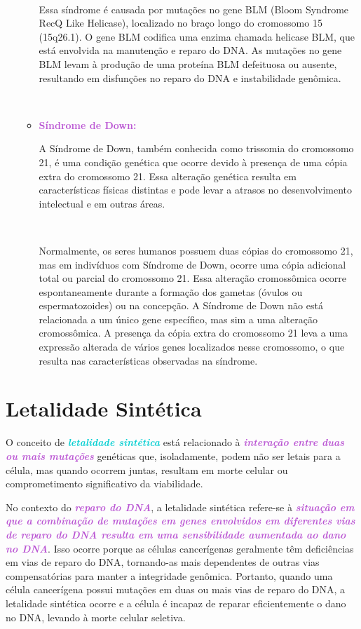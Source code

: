 \documentclass[11pt,a4paper]{article}
\begin{document}
\begin{itemize}[label=\textcolor{CarnationPink}{$\blacktriangleright$}]
\begin{itemize}[label=\textcolor{CarnationPink}{$\star$}]
			\

			Essa síndrome é causada por mutações no gene BLM (Bloom Syndrome RecQ Like Helicase), localizado no braço longo do cromossomo 15 (15q26.1). O gene BLM codifica uma enzima chamada helicase BLM, que está envolvida na manutenção e reparo do DNA. As mutações no gene BLM levam à produção de uma proteína BLM defeituosa ou ausente, resultando em disfunções no reparo do DNA e instabilidade genômica.

			\

			\item \textcolor{MediumOrchid}{\large\textbf{Síndrome de Down:}}
			
			A Síndrome de Down, também conhecida como trissomia do cromossomo 21, é uma condição genética que ocorre devido à presença de uma cópia extra do cromossomo 21. Essa alteração genética resulta em características físicas distintas e pode levar a atrasos no desenvolvimento intelectual e em outras áreas.

			\

			Normalmente, os seres humanos possuem duas cópias do cromossomo 21, mas em indivíduos com Síndrome de Down, ocorre uma cópia adicional total ou parcial do cromossomo 21. Essa alteração cromossômica ocorre espontaneamente durante a formação dos gametas (óvulos ou espermatozoides) ou na concepção. A Síndrome de Down não está relacionada a um único gene específico, mas sim a uma alteração cromossômica. A presença da cópia extra do cromossomo 21 leva a uma expressão alterada de vários genes localizados nesse cromossomo, o que resulta nas características observadas na síndrome.

		\end{itemize}
	\end{itemize}

\section{Letalidade Sintética}

	O conceito de \textcolor{DarkTurquoise}{\textbf{\textit{letalidade sintética}}} está relacionado à \textcolor{MediumOrchid}{\textbf{\textit{interação entre duas ou mais mutações}}} genéticas que, isoladamente, podem não ser letais para a célula, mas quando ocorrem juntas, resultam em morte celular ou comprometimento significativo da viabilidade.

	No contexto do \textcolor{MediumOrchid}{\textbf{\textit{reparo do DNA}}}, a letalidade sintética refere-se à \textcolor{MediumOrchid}{\textbf{\textit{situação em que a combinação de mutações em genes envolvidos em diferentes vias de reparo do DNA resulta em uma sensibilidade aumentada ao dano no DNA}}}. Isso ocorre porque as células cancerígenas geralmente têm deficiências em vias de reparo do DNA, tornando-as mais dependentes de outras vias compensatórias para manter a integridade genômica. Portanto, quando uma célula cancerígena possui mutações em duas ou mais vias de reparo do DNA, a letalidade sintética ocorre e a célula é incapaz de reparar eficientemente o dano no DNA, levando à morte celular seletiva. 
\end{document}
